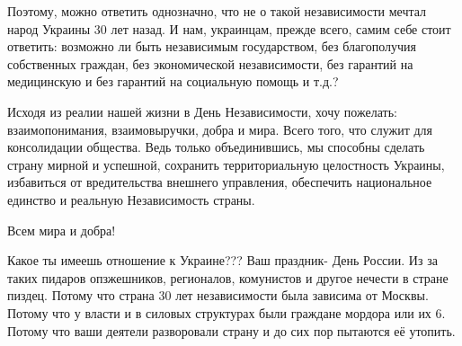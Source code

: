 Поэтому, можно ответить однозначно, что не о такой независимости мечтал народ
Украины 30 лет назад. И нам, украинцам, прежде всего, самим себе стоит
ответить: возможно ли быть независимым государством, без благополучия
собственных граждан,  без экономической независимости,  без гарантий на
медицинскую и без гарантий на социальную помощь  и т.д.?

Исходя из реалии нашей жизни в День Независимости, хочу пожелать:
взаимопонимания, взаимовыручки, добра и мира. Всего того, что служит для
консолидации общества. Ведь только объединившись, мы способны сделать
страну мирной и  успешной, сохранить территориальную целостность Украины,
избавиться от вредительства  внешнего управления,  обеспечить национальное
единство и реальную Независимость страны.

Всем мира и добра!

\begin{itemize}
 

Какое ты имеешь отношение к Украине??? Ваш праздник- День России. Из за таких
пидаров опзжешников, регионалов, комунистов и другое нечести в стране пиздец.
Потому что страна 30 лет независимости была зависима от Москвы. Потому что у
власти и в силовых структурах были граждане мордора или их 6. Потому что ваши
деятели разворовали страну и до сих пор пытаются её утопить.
\end{itemize}

